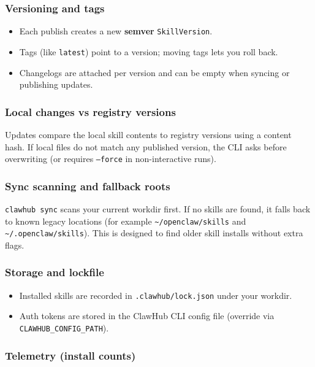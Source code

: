\subsubsection{Versioning and tags}


\begin{itemize}
  \item Each publish creates a new \textbf{semver} \texttt{SkillVersion}.
  \item Tags (like \texttt{latest}) point to a version; moving tags lets you roll back.
  \item Changelogs are attached per version and can be empty when syncing or publishing updates.
\end{itemize}


\subsubsection{Local changes vs registry versions}


Updates compare the local skill contents to registry versions using a content hash. If local files do not match any published version, the CLI asks before overwriting (or requires \texttt{--force} in non-interactive runs).

\subsubsection{Sync scanning and fallback roots}


\texttt{clawhub sync} scans your current workdir first. If no skills are found, it falls back to known legacy locations (for example \texttt{\textasciitilde{}/openclaw/skills} and \texttt{\textasciitilde{}/.openclaw/skills}). This is designed to find older skill installs without extra flags.

\subsubsection{Storage and lockfile}


\begin{itemize}
  \item Installed skills are recorded in \texttt{.clawhub/lock.json} under your workdir.
  \item Auth tokens are stored in the ClawHub CLI config file (override via \texttt{CLAWHUB\_CONFIG\_PATH}).
\end{itemize}


\subsubsection{Telemetry (install counts)}


